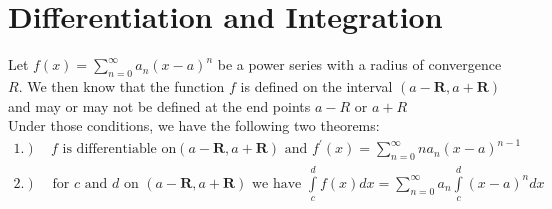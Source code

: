 \documentclass{article}
\begin{document}
\section{Differentiation and Integration}
	Let $f(x)=\sum\limits_{n=0}^{\infty}{a_n\left(x-a\right)^n}$ be a power series with a radius of convergence $R$. We then know that the function $f$ is defined on the interval $\left(a-\textbf{R},a+\textbf{R}\right)$ and may or may not be defined at the end points $a-R$ or $a+R$\\
	Under those conditions, we have the following two theorems:
	\begin{align*}
		\left.1.\right)&\ f\text{ is differentiable on} \left(a-\textbf{R},a+\textbf{R}\right)\text{ and } f^{'}(x)=\sum\limits_{n=0}^{\infty}{na_{n}\left(x-a\right)^{n-1} }\\
		\left.2.\right)&\text{ for }c\text{ and } d \text{ on } \left(a-\textbf{R},a+\textbf{R}\right) \text{ we have } \int\limits_{c}^{d}{f(x)dx}=\sum\limits_{n=0}^{\infty}a_{n}\int\limits_{c}^{d}\left(x-a\right)^{n}dx
	\end{align*}
	
\end{document}

